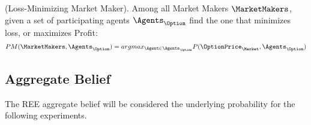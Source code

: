 \begin{definition} (Loss-Minimizing Market Maker).
\label{def:pmmm}
Among all Market Makers $\MarketMakers$, given a set of participating agents $\Agents_\Option$ find the one that minimizes loss, or maximizes Profit:
$$ PM(\MarketMakers, \Agents_\Option) = arg max_{\Agent \in \Agents_\Option} P(\OptionPrice_\Market, \Agents_\Option)$$
\end{definition}

\subsection{Aggregate Belief}
The REE aggregate belief will be considered the underlying probability for the following experiments.\\

